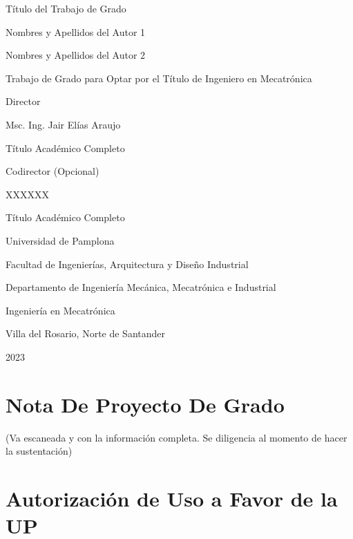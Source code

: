 \documentclass[11pt,openany]{book}
\begin{document}
\begin{titlepage}
    \thispagestyle{fancy}
    \lhead{\leftmark} \chead{} \rhead{\thepage} %
    \lfoot{}{} \cfoot{} \rfoot{}
    \centering
    \vfill
    {\large Título del Trabajo de Grado \par}
    \vfill
    {\large Nombres y Apellidos del Autor 1 \par}
    {\large Nombres y Apellidos del Autor 2 \par}
    \vfill
    {\large Trabajo de Grado para Optar por el Título de Ingeniero en Mecatrónica \par}
    \vfill
    {\large Director \par}
    {\large Msc. Ing. Jair Elías Araujo \par}
    {\large Título Académico Completo \par}
    \vfill
    {\large Codirector (Opcional) \par}
    {\large XXXXXX \par}
    {\large Título Académico Completo \par}
    \vfill
    {\large Universidad de Pamplona \par}
    {\large Facultad de Ingenierías, Arquitectura y Diseño Industrial \par}
    {\large Departamento de Ingeniería Mecánica, Mecatrónica e Industrial\par}
    {\large Ingeniería en Mecatrónica\par}
    {\large Villa del Rosario, Norte de Santander \par}
    {\large 2023 \par}
\end{titlepage}
\thispagestyle{empty}

\newpage

\chapter*{Nota De Proyecto De Grado}

\begin{center}
    (Va escaneada y con la información completa. Se diligencia al momento de hacer la sustentación)
\end{center}

\newpage

\chapter*{Autorización de Uso a Favor de la UP}
\end{document}
